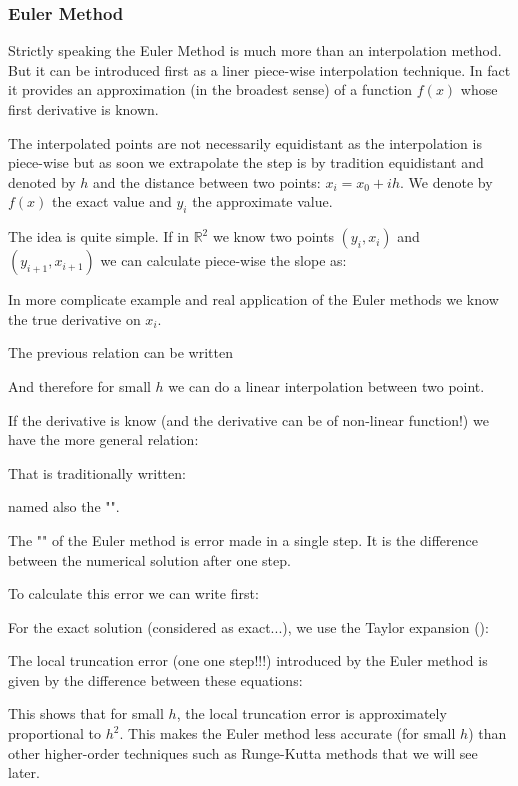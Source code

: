 	\subsubsection{Euler Method}
	Strictly speaking the Euler Method is much more than an interpolation method. But it can be introduced first as a liner piece-wise interpolation technique. In fact it provides an approximation (in the broadest sense) of a function $f (x)$ whose first derivative is known.
	
	The interpolated points are not necessarily equidistant as the interpolation is piece-wise but as soon we extrapolate the step is by tradition equidistant and denoted by $h$ and the distance between two points: $x_i=x_0+ih$. We denote by $f(x)$ the exact value and $y_i$ the approximate value.
	
	The idea is quite simple. If in $\mathbb{R}^2$ we know two points $(y_i,x_i)$ and $(y_{i+1},x_{i+1})$ we can calculate piece-wise the slope as:
	
	In more complicate example and real application of the Euler methods we know the true derivative on $x_i$.
	
	The previous relation can be written
	
	And therefore for small $h$ we can do a linear interpolation between two point.
	
	If the derivative is know (and the derivative can be of non-linear function!) we have the more general relation:
	
	That is traditionally written:
	
	named also the "".

	The "" of the Euler method is error made in a single step. It is the difference between the numerical solution after one step.
	
	To calculate this error we can write first:
	
	For the exact solution (considered as exact...), we use the Taylor expansion ():
	
	The local truncation error (one one step!!!) introduced by the Euler method is given by the difference between these equations:
	
	This shows that for small $h$, the local truncation error is approximately proportional to $h^2$. This makes the Euler method less accurate (for small $h$) than other higher-order techniques such as Runge-Kutta methods that we will see later.
	
